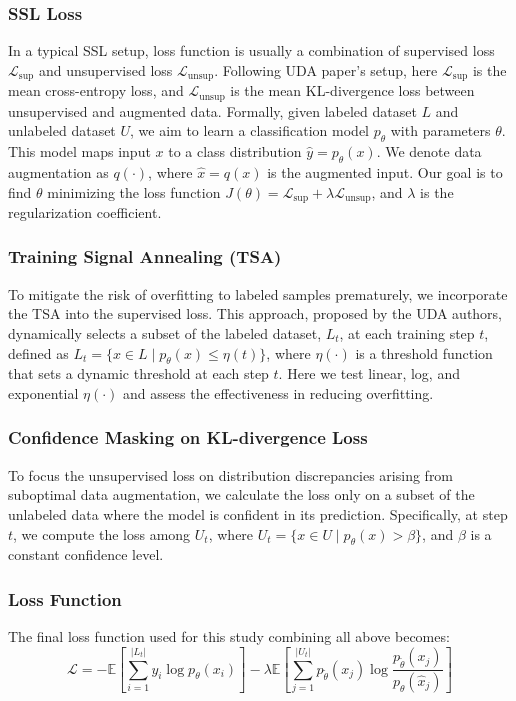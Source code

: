\documentclass{article}
\begin{document}
\subsubsection{SSL Loss}
In a typical SSL setup, loss function is usually a combination of 
supervised loss $\mathcal{L}_{\text{sup}}$ and unsupervised loss $\mathcal{L}_{\text{unsup}}$.
Following UDA paper's setup, here $\mathcal{L}_{\text{sup}}$ is the mean cross-entropy loss,
and $\mathcal{L}_{\text{unsup}}$ is the mean KL-divergence loss between unsupervised and 
augmented data.
Formally, given labeled dataset $L$ and unlabeled dataset $U$, we aim to learn a 
classification model $p_{\theta}$ with parameters $\theta$. This model maps input $x$ to a 
class distribution $\hat y = p_{\theta}(x)$. We denote data augmentation as $q(\cdot)$, 
where $\hat x = q(x)$ is the augmented input. Our goal is to find $\theta$ minimizing the 
loss function $J(\theta) = \mathcal{L}_{\text{sup}} + \lambda \mathcal{L}_{\text{unsup}}$, 
and $\lambda$ is the 
regularization coefficient.

\subsubsection{Training Signal Annealing (TSA)}
To mitigate the risk of overfitting to labeled samples prematurely, we incorporate the 
TSA into the supervised loss. This approach, proposed 
by the UDA authors, dynamically selects a subset of the labeled dataset, $L_t$, at each 
training step $t$, defined as $L_t = \{x \in L \mid p_{\theta}(x) \leq 
\eta(t)\}$, where $\eta(\cdot)$ is a threshold function that sets a dynamic threshold at 
each step $t$. 
Here we test linear, log, and exponential $\eta(\cdot)$ and assess the effectiveness in
reducing overfitting.

\subsubsection{Confidence Masking on KL-divergence Loss}
To focus the unsupervised loss on distribution discrepancies arising from suboptimal data 
augmentation, we calculate the loss only on a subset of the unlabeled data where the model 
is confident in its prediction. Specifically, at step $t$, we compute the loss among $U_t$, 
where $U_t = \{x \in U \mid p_{\theta}(x) > \beta\}$, and $\beta$ is a constant confidence 
level. 

\subsubsection{Loss Function}
The final loss function used for this study combining all above becomes:
$$\mathcal{L} = 
- \mathbb{E} \left[ \sum_{i=1}^{|L_t|} y_i \log p_{\theta}(x_i) \right]
- \lambda \mathbb{E} \left[ \sum_{j=1}^{|U_t|} p_{\tilde{\theta}}(x_j) \log 
\frac{p_{\tilde{\theta}}(x_j)}{p_{\theta}(\hat x_j)} \right]
$$
\end{document}
